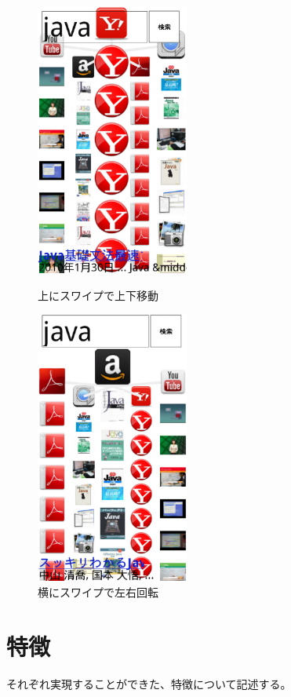 \begin{figure}[htbp]
 \begin{minipage}{0.45\hsize}
  \begin{center}
   \includegraphics[height=90mm]{eps/le05.eps}
  \end{center}
  \caption{上にスワイプで上下移動}
  \label{le05}
 \end{minipage}
 \begin{minipage}{0.45\hsize}
  \begin{center}
   \includegraphics[height=90mm]{eps/le06.eps}
  \end{center}
  \caption{横にスワイプで左右回転}
  \label{le06}
 \end{minipage}
\end{figure}

\section{特徴}
それぞれ実現することができた、特徴について記述する。

